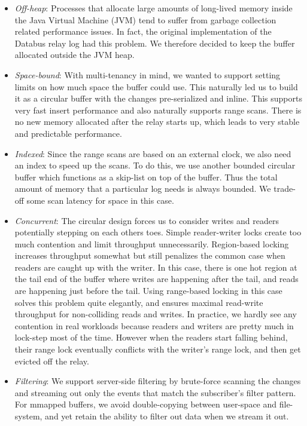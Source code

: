 \begin{itemize}
\item \emph{Off-heap}: Processes that allocate large amounts of long-lived memory inside the Java Virtual Machine (JVM) tend to suffer from garbage collection related performance issues. In fact, the original implementation of the Databus relay log had this problem. We therefore decided to keep the buffer allocated outside the JVM heap. 
\item \emph{Space-bound}: With multi-tenancy in mind, we wanted to support setting limits on how much space the buffer could use. This naturally led us to build it as a circular buffer with the changes pre-serialized and inline. This supports very fast insert performance and also naturally supports range scans. There is no new memory allocated after the relay starts up, which leads to very stable and predictable performance.
\item \emph{Indexed}: Since the range scans are based on an external clock, we also need an index to speed up the scans. To do this, we use another bounded circular buffer which functions as a skip-list on top of the buffer. Thus the total amount of memory that a particular log needs is always bounded. We trade-off some scan latency for space in this case. 
\item \emph{Concurrent}: The circular design forces us to consider writes and readers potentially stepping on each others toes. Simple reader-writer locks create too much contention and limit throughput unnecessarily. Region-based locking increases throughput somewhat but still penalizes the common case when readers are caught up with the writer. In this case, there is one hot region at the tail end of the buffer where writes are happening after the tail, and reads are happening just before the tail. Using range-based locking in this case solves this problem quite elegantly, and ensures maximal read-write throughput for non-colliding reads and writes. In practice, we hardly see any contention in real workloads because readers and writers are pretty much in lock-step most of the time. However when the readers start falling behind, their range lock eventually conflicts with the writer's range lock, and then get evicted off the relay. 
\item \emph{Filtering}: We support server-side filtering by brute-force scanning the changes and streaming out only the events that match the subscriber's filter pattern. For mmapped buffers, we avoid double-copying between user-space and file-system, and yet retain the ability to filter out data when we stream it out.
\end{itemize}

